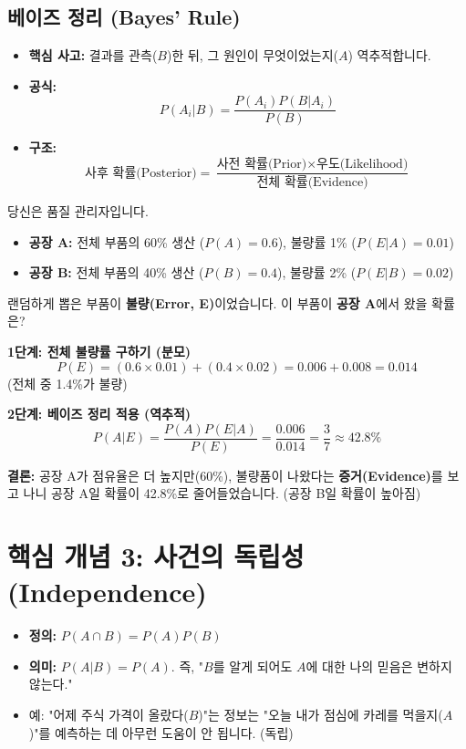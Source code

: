 \documentclass[11pt,a4paper]{book}
\theoremstyle{definition}
\begin{document}
\subsection{베이즈 정리 (Bayes' Rule)}
\begin{bayesbox}[title={시간을 거스르는 추론}]
\begin{itemize}
    \item \textbf{핵심 사고:} 결과를 관측($B$)한 뒤, 그 원인이 무엇이었는지($A$) 역추적합니다.
    \item \textbf{공식:}
    \[ P(A_i|B) = \frac{P(A_i)P(B|A_i)}{P(B)} \]
    \item \textbf{구조:}
    \[ \text{사후 확률(Posterior)} = \frac{\text{사전 확률(Prior)} \times \text{우도(Likelihood)}}{\text{전체 확률(Evidence)}} \]
\end{itemize}
\end{bayesbox}

\begin{storybox}[title={공장 불량품 추적 시나리오}]
당신은 품질 관리자입니다.
\begin{itemize}
    \item \textbf{공장 A:} 전체 부품의 60\% 생산 ($P(A)=0.6$), 불량률 1\% ($P(E|A)=0.01$)
    \item \textbf{공장 B:} 전체 부품의 40\% 생산 ($P(B)=0.4$), 불량률 2\% ($P(E|B)=0.02$)
\end{itemize}
랜덤하게 뽑은 부품이 \textbf{불량(Error, E)}이었습니다. 이 부품이 \textbf{공장 A}에서 왔을 확률은?

\textbf{1단계: 전체 불량률 구하기 (분모)}
\[ P(E) = (0.6 \times 0.01) + (0.4 \times 0.02) = 0.006 + 0.008 = 0.014 \]
(전체 중 1.4\%가 불량)

\textbf{2단계: 베이즈 정리 적용 (역추적)}
\[ P(A|E) = \frac{P(A)P(E|A)}{P(E)} = \frac{0.006}{0.014} = \frac{3}{7} \approx 42.8\% \]

\textbf{결론:} 공장 A가 점유율은 더 높지만(60\%), 불량품이 나왔다는 \textbf{증거(Evidence)}를 보고 나니 공장 A일 확률이 42.8\%로 줄어들었습니다. (공장 B일 확률이 높아짐)
\end{storybox}

\section{핵심 개념 3: 사건의 독립성 (Independence)}

\begin{conceptbox}[title={정보의 가치 평가}]
\begin{itemize}
    \item \textbf{정의:} $P(A \cap B) = P(A)P(B)$
    \item \textbf{의미:} $P(A|B) = P(A)$. 즉, "$B$를 알게 되어도 $A$에 대한 나의 믿음은 변하지 않는다."
    \item 예: "어제 주식 가격이 올랐다($B$)"는 정보는 "오늘 내가 점심에 카레를 먹을지($A$)"를 예측하는 데 아무런 도움이 안 됩니다. (독립)
\end{itemize}
\end{conceptbox}
\end{document}
